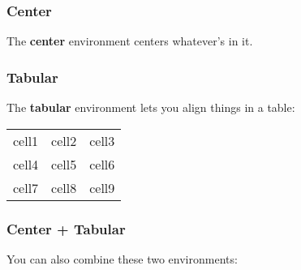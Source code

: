 \documentclass[11pt,letterpaper]{article}
\begin{document}
        \subsubsection{Center}
            \begin{center}
            The \textbf{center} environment centers whatever's in it.
            \end{center}
            
        \subsubsection{Tabular}
            The \textbf{tabular} environment lets you align things in a table:\\
            \begin{tabular}{ c c c } 
              cell1 & cell2 & cell3 \\ 
              cell4 & cell5 & cell6 \\ 
              cell7 & cell8 & cell9 \\ 
            \end{tabular}
    
            
            
            
            
            
        \subsubsection{Center + Tabular}
            You can also combine these two environments:
            
\end{document}
